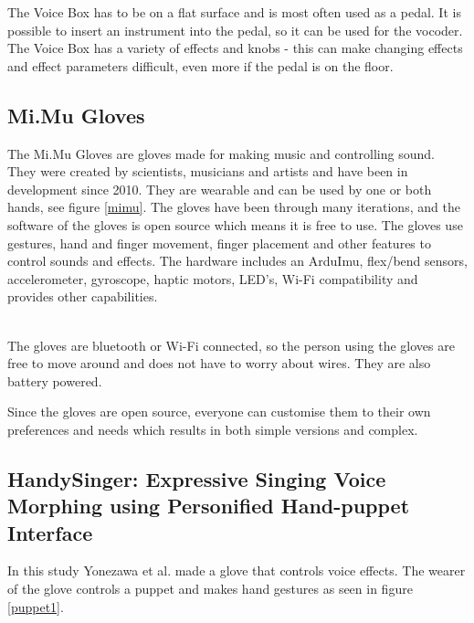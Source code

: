 The Voice Box has to be on a flat surface and is most often used as a pedal. It is possible to insert an instrument into the pedal, so it can be used for the vocoder. The Voice Box has a variety of effects and knobs - this can make changing effects and effect parameters difficult, even more if the pedal is on the floor.

\subsection{Mi.Mu Gloves}

The Mi.Mu Gloves are gloves made for making music and controlling sound\citep{Mimu}. They were created by scientists, musicians and artists and have been in development since 2010. They are wearable and can be used by one or both hands, see figure \ref{mimu}. The gloves have been through many iterations, and the software of the gloves is open source which means it is free to use. The gloves use gestures, hand and finger movement, finger placement and other features to control sounds and effects. The hardware includes an ArduImu, flex/bend sensors, accelerometer, gyroscope, haptic motors, LED's, Wi-Fi compatibility and provides other capabilities.\\

\begin{minipage}{\linewidth}%
\label{mimu}
\end{minipage}\\

The gloves are bluetooth or Wi-Fi connected, so the person using the gloves are free to move around and does not have to worry about wires. They are also battery powered. 

Since the gloves are open source, everyone can customise them to their own preferences and needs which results in both simple versions and complex.

\subsection{HandySinger: Expressive Singing Voice Morphing using Personified Hand-puppet Interface}

In this study Yonezawa et al. made a glove that controls voice effects\citep{Yonezawa_2005}. The wearer of the glove controls a puppet and makes hand gestures as seen in figure \ref{puppet1}. \\

